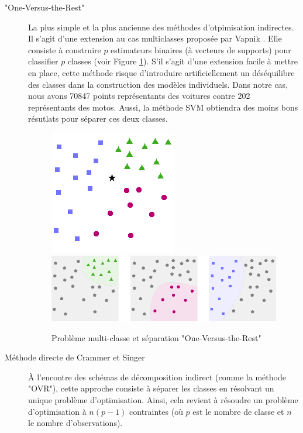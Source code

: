 \documentclass[a4paper]{report}
\begin{document}
\begin{description}

\item["One-Versus-the-Rest"] La plus simple et la plus ancienne des méthodes d'otpimisation indirectes. Il s'agit d'une extension au cas multiclasses proposée par Vapnik \cite{Vapnik}. Elle consiste à construire $p$ estimateurs binaires (à vecteurs de supports) pour classifier $p$ classes (voir Figure \ref{fig:one_versus_rest}). S'il s'agit d'une extension facile à mettre en place, cette méthode risque d'introduire artificiellement un déséquilibre des classes dans la construction des modèles individuels. Dans notre cas, nous avons 70847 points représentants des voitures contre 202 représentants des motos. Aussi, la méthode SVM obtiendra des moins bons résutlats pour séparer ces deux classes.

\begin{figure}
\centering
\includegraphics[scale=0.6]{img/svm.png}
\includegraphics[scale=0.6]{img/svm_OneVsAll.png}
\caption{Problème multi-classe et séparation "One-Versus-the-Rest"\label{fig:one_versus_rest}}
\end{figure}

\item[Méthode directe de Crammer et Singer \cite{Crammer}] À l'encontre des schémas de décomposition indirect (comme la méthode "OVR"), cette approche cons\-iste à séparer les classes en résolvant un unique problème d'optimisation. Ainsi, cela revient à résoudre un problème d'optimisation à $n(p-1)$ contraintes (où $p$ est le nombre de classe et $n$ le nombre d'observations).

\end{description}
\end{document}
